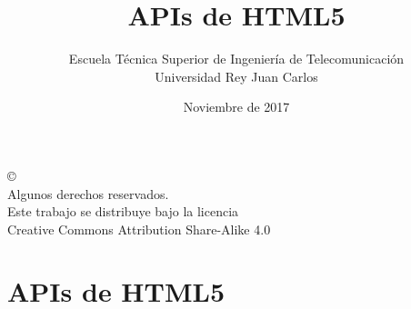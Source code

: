 \documentclass[ucs]{beamer}
\begin{document}
\title[APIs de HTML5]{APIs de HTML5}
\author[GSyC]{Escuela Técnica Superior de Ingeniería de Telecomunicación\\
Universidad Rey Juan Carlos}
\date[2017]{Noviembre de 2017}


\begin{frame}
  \titlepage
\end{frame}




\begin{frame}[b]
\begin{flushright}
{\tiny
\copyright \insertshortdate~\insertshortauthor \\
  Algunos derechos reservados. \\
  Este trabajo se distribuye bajo la licencia \\
  Creative Commons Attribution Share-Alike 4.0
}
\end{flushright}
\end{frame}



%

\section{APIs de HTML5}
\end{document}
